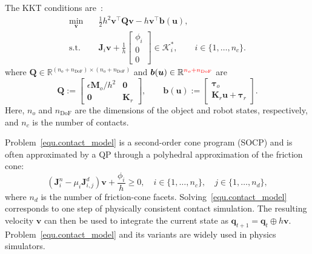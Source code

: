 The KKT conditions are~\cite{avriel2003nonlinear,anitescu2006optimization}:
\begin{subequations}
\label{equ.contact_model}
\begin{align}
 \min_{\boldsymbol{v}}\quad
 &
 \frac{1}{2}h^{2}
 \boldsymbol{v}^{\top}
 \boldsymbol{Q}
 \boldsymbol{v}
 -
 h
 \boldsymbol{v}^{\top}
 \boldsymbol{b}(\boldsymbol{u}),
 \label{equ.qs_model_obj}
 \\
 \mathrm{s.t.}\quad
 &
 \boldsymbol{J}_i\boldsymbol{v}
 +
 \frac{1}{h}
 \begin{bmatrix}
 \phi_i\\
 0\\
 0
 \end{bmatrix}
 \in
 \mathcal{K}_i^{*},
 \qquad
 i\in\{1,\ldots,n_c\}.
 \label{equ.contact_model_con}
\end{align}
\end{subequations}
\noindent where
$\boldsymbol{Q} \in
\mathbb{R}^{(n_o+n_{\text{DoF}})\times(n_o+n_{\text{DoF}})}$
and
$\boldsymbol{b}(\boldsymbol{u}) \in
\mathbb{R}^{\textcolor{red}{n_o+n_{\text{DoF}}}}$
are
\begin{equation}
 \boldsymbol{Q}
:=
 \begin{bmatrix}
 \epsilon\boldsymbol{M}_o/h^{2} & \boldsymbol{0}\\
 \boldsymbol{0} & \boldsymbol{K}_r
 \end{bmatrix},
 \qquad
 \boldsymbol{b}(\boldsymbol{u})
:=
 \begin{bmatrix}
 \boldsymbol{\tau}_o\\
 \boldsymbol{K}_r\boldsymbol{u}+\boldsymbol{\tau}_r
 \end{bmatrix}.
 \label{equ.q_matrix}
\end{equation}
\noindent Here, $n_o$ and $n_{\mathrm{DoF}}$ are the dimensions of the object and robot states, respectively, and $n_c$ is the number of contacts.

Problem~\eqref{equ.contact_model} is a second-order cone program (SOCP) and is often approximated by a QP through a polyhedral approximation of the friction cone:
\begin{equation}
 \left(
 \boldsymbol{J}_i^{n}
 -
 \mu_i\boldsymbol{J}_{i,j}^{d}
 \right)
 \boldsymbol{v}
 +
 \frac{\phi_i}{h}
 \geq 0,
 \quad
 i\in\{1,\ldots,n_c\},
 \quad
 j\in\{1,\ldots,n_d\},
\end{equation}
\noindent where $n_d$ is the number of friction-cone facets.
Solving~\eqref{equ.contact_model} corresponds to one step of physically consistent contact simulation.
The resulting velocity $\boldsymbol{v}$ can then be used to integrate the current state as
$\boldsymbol{q}_{t+1}
=
\boldsymbol{q}_{t}
\oplus
h\boldsymbol{v}$.
Problem~\eqref{equ.contact_model} and its variants are widely used in physics simulators.

